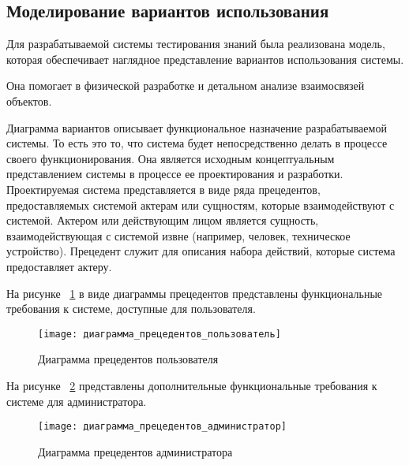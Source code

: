 \subsection{Моделирование вариантов использования}

Для разрабатываемой системы тестирования знаний была реализована модель, которая обеспечивает наглядное представление вариантов использования системы.

Она помогает в физической разработке и детальном анализе взаимосвязей объектов.

Диаграмма вариантов описывает функциональное назначение разрабатываемой системы. То есть это то, что система будет непосредственно делать в процессе своего функционирования. Она является исходным концептуальным представлением системы в процессе ее проектирования и разработки. Проектируемая система представляется в виде ряда прецедентов, предоставляемых системой актерам или сущностям, которые взаимодействуют с системой. Актером или действующим лицом является сущность, взаимодействующая с системой извне (например, человек, техническое устройство). Прецедент служит для описания набора действий, которые система предоставляет актеру.

\clearpage

На рисунке ~\ref{user_precedent_diagram:image} в виде диаграммы прецедентов представлены функциональные требования к системе, доступные для пользователя.

\begin{figure}[H]
	\texttt{[image: диаграмма\_прецедентов\_пользователь]}
	\caption{Диаграмма прецедентов пользователя}
	\label{user_precedent_diagram:image}
\end{figure}

\clearpage

На рисунке ~\ref{admin_precedent_diagram:image} представлены дополнительные функциональные требования к системе для администратора.

\begin{figure}[H]
	\texttt{[image: диаграмма\_прецедентов\_администратор]}
	\caption{Диаграмма прецедентов администратора}
	\label{admin_precedent_diagram:image}
\end{figure}

